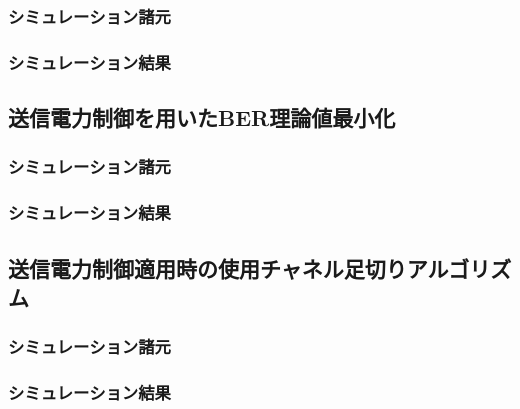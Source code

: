 \subsubsection{シミュレーション諸元}
\subsubsection{シミュレーション結果}
\subsection{送信電力制御を用いたBER理論値最小化}
\subsubsection{シミュレーション諸元}
\subsubsection{シミュレーション結果}
\subsection{送信電力制御適用時の使用チャネル足切りアルゴリズム}
\subsubsection{シミュレーション諸元}
\subsubsection{シミュレーション結果}
